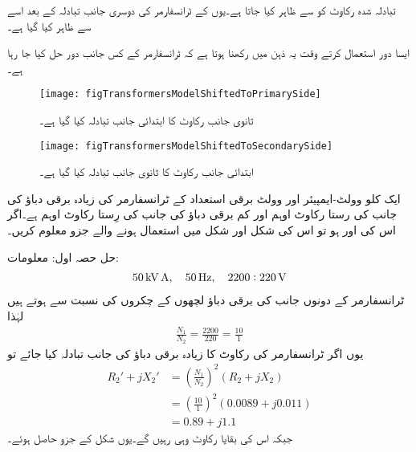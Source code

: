 تبادلہ شدہ رکاوٹ   کو   سے ظاہر کیا جاتا ہے۔یوں  کے ٹرانسفارمر کی دوسری جانب تبادلہ کے بعد اسے  سے ظاہر کیا گیا ہے۔

ایسا دور استعمال کرتے وقت یہ ذہن میں رکھنا ہوتا ہے کہ ٹرانسفارمر کے کس جانب دور حل کیا جا رہا ہے۔
\begin{figure}
\centering
\texttt{[image: figTransformersModelShiftedToPrimarySide]}
\caption{ثانوی جانب رکاوٹ کا ابتدائی جانب تبادلہ کیا گیا ہے۔}
\label{شکل_ٹرانسفارمر_مکمل_ماڈل_ابتدائی_جانب}
\end{figure}
%
\begin{figure}
\centering
\texttt{[image: figTransformersModelShiftedToSecondarySide]}
\caption{ابتدائی جانب رکاوٹ کا ثانوی جانب تبادلہ کیا گیا ہے۔}
\label{شکل_ٹرانسفارمر_مکمل_ماڈل_ثانوی_جانب}
\end{figure}


%
ایک  کلو وولٹ-ایمپیئر اور   وولٹ برقی استعداد کے ٹرانسفارمر کی زیادہ برقی دباؤ کی جانب کی رستا رکاوٹ   اوہم اور کم برقی دباؤ کی جانب کی رِستا رکاوٹ  اوہم ہے۔اگر اس کی  اور   ہو تو اس کی شکل   اور شکل   میں استعمال ہونے والے جزو معلوم کریں۔

	حل حصہ اول:
معلومات:
\begin{align*}
\SI{50}{\kilo \volt \ampere}, \quad \SI{50}{\hertz}, \quad 2200:220\,\textup{V}
\end{align*}
ٹرانسفارمر کے دونوں جانب کی برقی دباؤ لچھوں کے چکروں کی نسبت سے ہوتے ہیں لہٰذا
\begin{align*}
\frac{N_1}{N_2}=\frac{2200}{220}=\frac{10}{1}
\end{align*}
یوں اگر ٹرانسفارمر کی رکاوٹ کا زیادہ برقی دباؤ کی جانب تبادلہ کیا جائے تو
\begin{align*}
R_2'+j X_2' &=\left(\frac{N_1}{N_2} \right)^2 \left(R_2+j X_2 \right)\\
&=\left(\frac{10}{1} \right)^2 \left(0.0089+j 0.011 \right)\\
&=0.89+j 1.1
\end{align*}
جبکہ اس کی بقایا رکاوٹ وہی رہیں گے۔یوں شکل   کے جزو حاصل ہوئے۔

